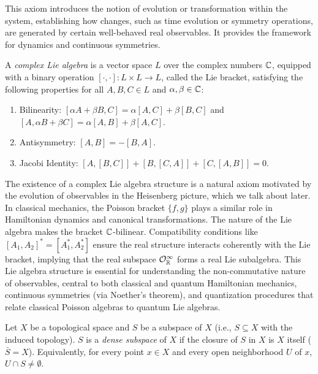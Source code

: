 This axiom introduces the notion of evolution or transformation within the system, establishing how changes, such as time evolution or symmetry operations, are generated by certain well-behaved real observables. It provides the framework for dynamics and continuous symmetries.

\begin{definition}
A \textit{complex Lie algebra} is a vector space $L$ over the complex numbers $\mathbb{C}$, equipped with a binary operation $[\cdot, \cdot]: L \times L \to L$, called the Lie bracket, satisfying the following properties for all $A, B, C \in L$ and $\alpha, \beta \in \mathbb{C}$:
\begin{enumerate}
\item Bilinearity: $[\alpha A + \beta B, C] = \alpha[A, C] + \beta[B, C]$ and $[A, \alpha B + \beta C] = \alpha[A, B] + \beta[A, C]$.
\item Antisymmetry: $[A, B] = -[B, A]$.
\item Jacobi Identity: $[A, [B, C]] + [B, [C, A]] + [C, [A, B]] = 0$.
\end{enumerate}
\end{definition}

The existence of a complex Lie algebra structure is a natural axiom motivated by the evolution of observables in the Heisenberg picture, which we talk about later. In classical mechanics, the Poisson bracket $\{f, g\}$ plays a similar role in Hamiltonian dynamics and canonical transformations. The  nature of the Lie algebra makes the bracket $\mathbb{C}$-bilinear. Compatibility conditions like $[A_1, A_2]^* = [A_1^*, A_2^*]$ ensure the real structure interacts coherently with the Lie bracket, implying that the real subspace $\mathcal{O}_{\mathbb{R}}^{\infty}$ forms a real Lie subalgebra. This Lie algebra structure is essential for understanding the non-commutative nature of observables, central to both classical and quantum Hamiltonian mechanics, continuous symmetries (via Noether’s theorem), and quantization procedures that relate classical Poisson algebras to quantum Lie algebras.

\begin{definition}
Let $X$ be a topological space and $S$ be a subspace of $X$ (i.e., $S \subseteq X$ with the induced topology). $S$ is a \textit{dense subspace} of $X$ if the closure of $S$ in $X$ is $X$ itself ($\bar{S} = X$). Equivalently, for every point $x \in X$ and every open neighborhood $U$ of $x$, $U \cap S \neq \emptyset$.
\end{definition}

